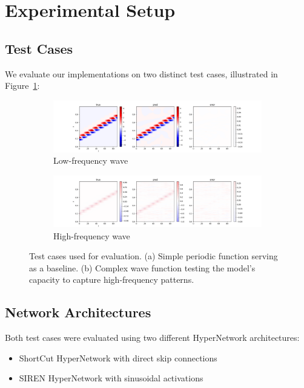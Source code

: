 \documentclass[10pt,journal,compsoc,onecolumn]{IEEEtran}
\begin{document}
\section{Experimental Setup}
\subsection{Test Cases}

We evaluate our implementations on two distinct test cases, illustrated in Figure~\ref{fig:test_cases}:

\begin{figure}[t]
    \centering
    \begin{subfigure}[b]{0.48\linewidth}
        \includegraphics[width=\linewidth]{../../results/functional-api/low-frequency/vis}
        \caption{Low-frequency wave}
    \end{subfigure}
    \begin{subfigure}[b]{0.48\linewidth}
        \includegraphics[width=\linewidth]{../../results/functional-api/high-frequency/vis}
        \caption{High-frequency wave}
    \end{subfigure}
    \caption{Test cases used for evaluation. (a) Simple periodic function serving as a baseline. (b) Complex wave function testing the model's capacity to capture high-frequency patterns.}
    \label{fig:test_cases}
\end{figure}

\subsection{Network Architectures}
Both test cases were evaluated using two different HyperNetwork architectures:
\begin{itemize}
    \item ShortCut HyperNetwork with direct skip connections
    \item SIREN HyperNetwork with sinusoidal activations
\end{itemize}
\end{document}
